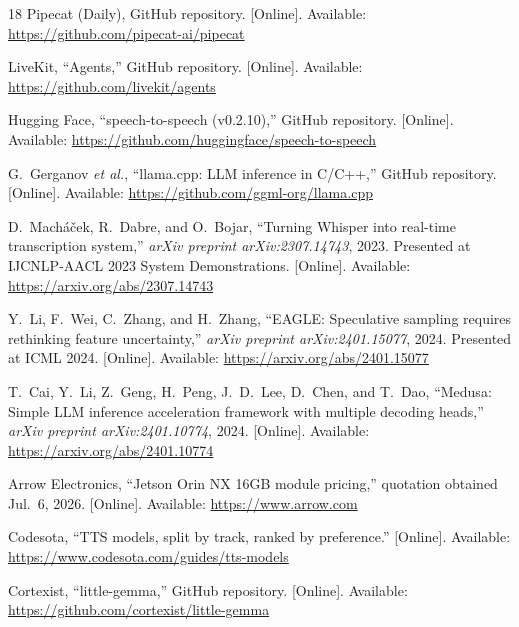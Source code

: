 \documentclass{article}
\begin{document}
\begin{thebibliography}{18}
	Pipecat (Daily), GitHub repository. [Online]. Available: \url{https://github.com/pipecat-ai/pipecat}

	LiveKit, ``Agents,'' GitHub repository. [Online]. Available: \url{https://github.com/livekit/agents}

	Hugging Face, ``speech-to-speech (v0.2.10),'' GitHub repository. [Online]. Available: \url{https://github.com/huggingface/speech-to-speech}

	G.~Gerganov \emph{et al.}, ``llama.cpp: LLM inference in C/C++,'' GitHub repository. [Online]. Available: \url{https://github.com/ggml-org/llama.cpp}

	D.~Macháček, R.~Dabre, and O.~Bojar, ``Turning Whisper into real-time transcription system,'' \emph{arXiv preprint arXiv:2307.14743}, 2023. Presented at IJCNLP-AACL 2023 System Demonstrations. [Online]. Available: \url{https://arxiv.org/abs/2307.14743}

	Y.~Li, F.~Wei, C.~Zhang, and H.~Zhang, ``EAGLE: Speculative sampling requires rethinking feature uncertainty,'' \emph{arXiv preprint arXiv:2401.15077}, 2024. Presented at ICML 2024. [Online]. Available: \url{https://arxiv.org/abs/2401.15077}

	T.~Cai, Y.~Li, Z.~Geng, H.~Peng, J.~D.~Lee, D.~Chen, and T.~Dao, ``Medusa: Simple LLM inference acceleration framework with multiple decoding heads,'' \emph{arXiv preprint arXiv:2401.10774}, 2024. [Online]. Available: \url{https://arxiv.org/abs/2401.10774}

	Arrow Electronics, ``Jetson Orin NX 16GB module pricing,'' quotation obtained Jul.~6, 2026. [Online]. Available: \url{https://www.arrow.com}

	Codesota, ``TTS models, split by track, ranked by preference.'' [Online]. Available: \url{https://www.codesota.com/guides/tts-models}

	Cortexist, ``little-gemma,'' GitHub repository. [Online]. Available: \url{https://github.com/cortexist/little-gemma}

\end{thebibliography}
\end{document}
